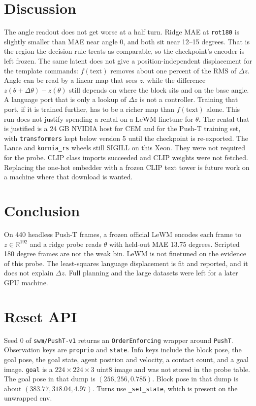 \documentclass[11pt,a4paper]{article}
\begin{document}
\section{Discussion}
\label{sec:discussion}
The angle readout does not get worse at a half turn.
Ridge MAE at \texttt{rot180} is slightly smaller than MAE near angle 0, and both sit near 12--15 degrees.
That is the region the decision rule treats as comparable, so the checkpoint's encoder is left frozen.
The same latent does not give a position-independent displacement for the template commands: $f(\mathrm{text})$ removes about one percent of the RMS of $\Delta z$.
Angle can be read by a linear map that sees $z$, while the difference $z(\theta+\Delta\theta)-z(\theta)$ still depends on where the block sits and on the base angle.
A language port that is only a lookup of $\Delta z$ is not a controller.
Training that port, if it is trained further, has to be a richer map than $f(\mathrm{text})$ alone.
This run does not justify spending a rental on a LeWM finetune for $\theta$.
The rental that is justified is a 24 GB NVIDIA host for CEM and for the Push-T training set, with \texttt{transformers} kept below version 5 until the checkpoint is re-exported.
The Lance and \texttt{kornia\_rs} wheels still SIGILL on this Xeon.
They were not required for the probe.
CLIP class imports succeeded and CLIP weights were not fetched.
Replacing the one-hot embedder with a frozen CLIP text tower is future work on a machine where that download is wanted.

\section{Conclusion}
\label{sec:conclusion}
On 440 headless Push-T frames, a frozen official LeWM encodes each frame to $z\in\mathbb{R}^{192}$ and a ridge probe reads $\theta$ with held-out MAE 13.75 degrees.
Scripted 180 degree frames are not the weak bin.
LeWM is not finetuned on the evidence of this probe.
The least-squares language displacement is fit and reported, and it does not explain $\Delta z$.
Full planning and the large datasets were left for a later GPU machine.

\appendix
\section{Reset API}
\label{app:api}
Seed 0 of \texttt{swm/PushT-v1} returns an \texttt{OrderEnforcing} wrapper around \texttt{PushT}.
Observation keys are \texttt{proprio} and \texttt{state}.
Info keys include the block pose, the goal pose, the goal state, agent position and velocity, a contact count, and a goal image.
\texttt{goal} is a $224\times 224\times 3$ uint8 image and was not stored in the probe table.
The goal pose in that dump is $(256, 256, 0.785)$.
Block pose in that dump is about $(383.77, 318.04, 4.97)$.
Turns use \texttt{\_set\_state}, which is present on the unwrapped env.



\end{document}
